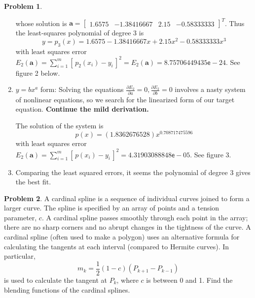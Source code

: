 \documentclass[10pt]{article}
\theoremstyle{plain}
\theoremstyle{definition}
\newtheorem{prob}{Problem}
\numberwithin{equation}{section}
\begin{document}
\begin{prob}
\begin{enumerate}[\bfseries(a)]
\[\]
whose solution is
$\bm{a} = \begin{bmatrix} 1.6575 & -1.38416667 & 2.15 & -0.58333333 \end{bmatrix}^T$. Thus
the least-squares polynomial of degree 3 is
\[
        \boxed{y = p_3(x) = 1.6575  - 1.38416667 x + 2.15 x^2  - 0.58333333 x^3}
\]
        with least squares error
        $E_2(\bm{a}) = \sum_{i=1}^m \left[\, p_2(x_i) - y_i\, \right]^2 =
        E_2(\bm{a})= 8.75706449435 \mathsf{e}-24$.
    See figure 2 below.
\item   $y= bx^a$ form:
    Solving the equations $\frac{\partial E_2}{\partial a} = 0 , \frac{\partial E_2}{\partial b} = 0$
    involves a nasty system of nonlinear equations, so we search for the
    linearized form of our target equation. \textbf{Continue the mild derivation.}

    The solution of the system is
    \[\boxed{p(x) = (1.8362676528) x^{0.708717475596}}\]
    with least squares error
    $E_2(\bm{a}) = \sum_{i=1}^m \left[\, p(x_i) - y_i\, \right]^2 =  4.31903088848\mathsf{e}-05$.
    See figure 3.
\item Comparing the least squared errors, it seems the polynomial of degree 3 gives the best fit.
\end{enumerate}

\end{prob}

\begin{prob}
    A cardinal spline is a sequence of individual curves joined to form a
    larger curve. The spline is specified by an array of points and a tension
    parameter, $c$. A cardinal spline passes smoothly through each point in the
    array; there are no sharp corners and no abrupt changes in the tightness
    of the curve. A cardinal spline (often used to make a polygon) uses an
    alternative formula for calculating the tangents at each interval
    (compared to Hermite curves). In particular, 
    \[
            m_k = \frac{1}{2}(1-c)\left(P_{k+1} - P_{k-1}\right)
        \]
    is used to calculate the tangent at $P_k$, where $c$ is between 0 and 1.
    Find the blending functions of the cardinal splines.
\end{prob}
\end{document}
